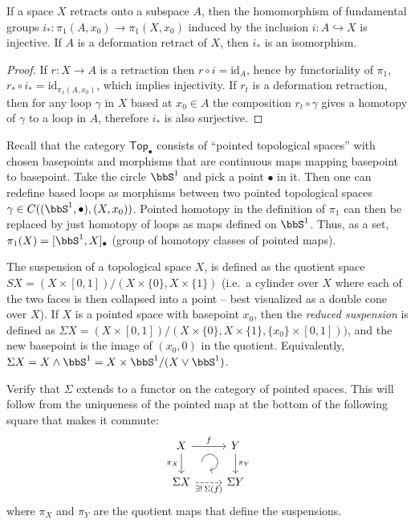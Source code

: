 \begin{thm}
    If a space $X$ retracts onto a subspace $A$, then the homomorphism of fundamental groups $i_\ast:\pi_1(A,x_0)\to \pi_1(X,x_0)$ induced by the inclusion $i: A\hookrightarrow X$ is injective. If $A$ is a deformation retract of $X$, then $i_\ast$ is an isomorphism.
\end{thm}
\begin{proof}
    If $r:X\to A$ is a retraction then $r\circ i=\mathrm{id}_A$, hence by functoriality of $\pi_1$, $r_\ast \circ i_\ast=\mathrm{id}_{\pi_1(A,x_0)}$, which implies injectivity. If $r_t$ is a deformation retraction, then for any loop $\gamma$ in $X$ based at $x_0\in A$ the composition $r_t\circ \gamma$ gives a homotopy of $\gamma$ to a loop in $A$, therefore $i_\ast$ is also surjective.
\end{proof}

\begin{defn}
Recall that the category $\mathsf{Top}_\bullet$ consists of ``pointed topological spaces'' with chosen basepoints and morphisms that are continuous maps mapping basepoint to basepoint. Take the circle $\bbS^1$ and pick a point $\bullet$ in it. Then one can redefine based loops as morphisms between two pointed topological spaces $\gamma\in C((\bbS^1,\bullet),(X,x_0))$. Pointed homotopy in the definition of $\pi_1$ can then be replaced by just homotopy of loops as maps defined on $\bbS^1$.   Thus, as a set, $\pi_1(X)=[\bbS^1,X]_\bullet$ (group of homotopy classes of pointed maps).
\end{defn}

\begin{defn}[Suspension]
    The suspension of a topological space $X$, is defined as the quotient space $SX=(X\times [0,1])/(X\times \{0\},X\times\{1\})$ (i.e.\ a cylinder over $X$ where each of the two faces is then collapsed into a point -- best visualized as a double cone over $X$). If $X$ is a pointed space with basepoint $x_0$, then the \emph{reduced suspension} is defined as $\Sigma X=(X\times [0,1])/(X\times \{0\},X\times\{1\} ,\{x_0\}\times [0,1]))$, and the new basepoint is the image of $(x_0,0)$ in the quotient. Equivalently, $\Sigma X=X\wedge \bbS^1=X\times \bbS^1/(X\vee \bbS^1)$.
\end{defn}

\begin{xca}
    Verify that $\Sigma$ extends to a functor on the category of pointed spaces. This will follow from the uniqueness of the pointed map at the bottom of the following square that makes it commute:
    \[\begin{tikzcd}[every matrix/.append style={name=m},   
    execute at end picture={\draw [<-] ([xshift=-2.3em,yshift=1mm]m-2-2.north) arc[start angle=-90,delta angle=270,radius=0.25cm];}]
   X \arrow[r,"f"]\arrow[d,swap,"\pi_X"]& Y\arrow[d,"\pi_Y"] \\
   \Sigma X\arrow[r,swap,dashed, "\exists !\,\Sigma(f)"]& \Sigma Y
    \end{tikzcd}\]
    where $\pi_X$ and $\pi_Y$ are the quotient maps that define the suspensions.
\end{xca}

